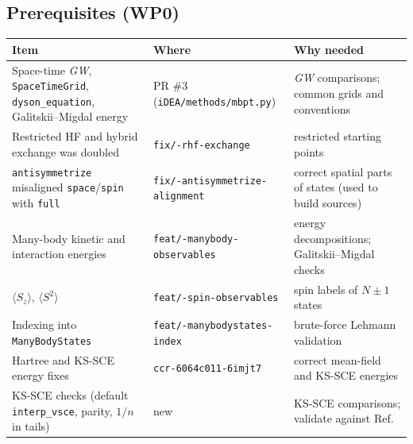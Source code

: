 \documentclass[11pt,a4paper]{article}
\newcommand{\GW}{\textit{GW}}
\newcommand{\code}[1]{\texttt{#1}}
\begin{document}
\subsection{Prerequisites (WP0)}\label{sec:prereq}
\begin{table}[h]
\centering\small
\footnotesize
\begin{tabularx}{\textwidth}{@{}>{\hsize}Y>{\hsize}Y>{\hsize}Y@{}}
\toprule
Item & Where & Why needed\\
\midrule
Space-time \GW, \code{SpaceTimeGrid}, \code{dyson\_equation}, Galitskii--Migdal energy & PR \#3 (\code{iDEA/\allowbreak methods/\allowbreak mbpt.py}) & \GW{} comparisons; common grids and conventions\\
Restricted HF and hybrid exchange was doubled & \code{fix/-rhf-\allowbreak exchange} & restricted starting points\\
\code{antisymmetrize} misaligned \code{space}/\code{spin} with \code{full} & \code{fix/-antisymmetrize-\allowbreak alignment} & correct spatial parts of states (used to build sources)\\
Many-body kinetic and interaction energies & \code{feat/-manybody-\allowbreak observables} & energy decompositions; Galitskii--Migdal checks\\
$\langle S_z\rangle$, $\langle S^2\rangle$ & \code{feat/-spin-\allowbreak observables} & spin labels of $N\pm1$ states\\
Indexing into \code{ManyBodyStates} & \code{feat/-manybodystates-\allowbreak index} & brute-force Lehmann validation\\
Hartree and KS-SCE energy fixes & \code{ccr-\allowbreak 6064c011-\allowbreak 6imjt7} & correct mean-field and KS-SCE energies\\
KS-SCE checks (default \code{interp\_vsce}, parity, $1/n$ in tails) & new & KS-SCE comparisons; validate against Ref.~\cite{malet2013}\\
\bottomrule
\end{tabularx}
\end{table}
\end{document}
